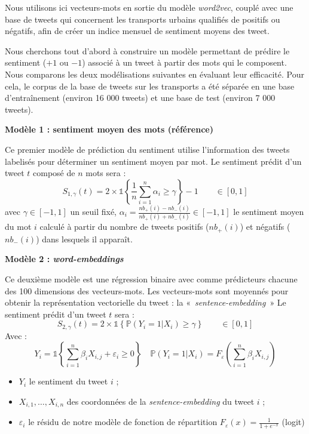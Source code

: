\documentclass[10pt,french,french]{article}
\begin{document}
Nous utilisons ici vecteurs-mots en sortie du modèle \emph{word2vec}, couplé avec une base de tweets qui concernent les transports urbains qualifiés de positifs ou négatifs, afin de créer un indice mensuel de sentiment moyens des tweet.

Nous cherchons tout d'abord à construire un modèle permettant de prédire le sentiment (\(+1\) ou \(-1\)) associé à un tweet à partir des mots qui le composent. Nous comparons les deux modélisations suivantes en évaluant leur efficacité. Pour cela, le corpus de la base de tweets sur les transports a été séparée en une base d'entraînement (environ 16 000 tweets) et une base de test (environ 7 000 tweets).

\begin{multicols}{2}

\textbf{Modèle 1 : sentiment moyen des mots (référence)}

Ce premier modèle de prédiction du sentiment utilise l'information des tweets labelisés pour déterminer un sentiment moyen par mot.
Le sentiment prédit d'un tweet $t$ composé de $n$ mots sera :
$$S_{1,\gamma}(t) = 2 \times \mathds{1}\left\{ \frac{1}{n} \sum \limits_{i=1}^n \alpha_i \geq \gamma\right\} - 1 \qquad \in [0,1]$$
  avec $\gamma \in [-1,1]$ un seuil fixé, $\alpha_i = \frac{nb_+(i) - nb_-(i)}{nb_+(i) + nb_-(i)} \in [-1,1]$  le sentiment moyen du mot $i$ calculé à partir du nombre de tweets positifs ($nb_+(i)$) et négatifs ($nb_-(i)$) dans lesquels il apparaît.

\vspace{2.5cm}

\textbf{Modèle 2 : \emph{word-embeddings}}

Ce deuxième modèle est une régression binaire avec comme prédicteurs chacune des 100 dimensions des vecteurs-mots. Les vecteurs-mots sont moyennés pour obtenir la représentation vectorielle du tweet : la  « \emph{sentence-embedding} »
Le sentiment prédit d'un tweet $t$ sera :
 $$S_{2,\gamma}(t) = 2 \times \mathds{1}\left\{   \mathbb{P}(Y_i = 1 | X_{i}) \ge \gamma\right\} \qquad \in [0,1]$$
Avec : 
$$Y_i = \mathds{1}\left\{ \sum_{i = 1}^n \beta_i X_{i,j} + \varepsilon_i \geq 0 \right\} 
\quad  \mathbb{P}(Y_i = 1 | X_{i}) = F_{\varepsilon}\left(\sum_{i = 1}^n \beta_i X_{i,j}\right)$$
\begin{itemize}
\item $Y_i$ le sentiment du tweet $i$ ;
\item $X_{i,1}, \dots, X_{i,n}$ des coordonnées de la \emph{sentence-embedding} du tweet $i$ ;
\item $\varepsilon_i$ le résidu de notre modèle de fonction de répartition $F_{\varepsilon}(x) = \frac{1}{1 + e^{-x}}$ (logit)
\end{itemize}

 \end{multicols}
\end{document}
